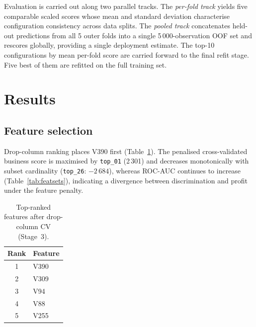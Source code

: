 \documentclass[cameraready]{Interspeech}
\begin{document}
Evaluation is carried out along two parallel tracks.
The \emph{per-fold track} yields five comparable scaled scores whose mean and standard
deviation characterise configuration consistency across data splits.
The \emph{pooled track} concatenates held-out predictions from all 5 outer folds into a
single 5\,000-observation OOF set and rescores globally, providing a single deployment
estimate.
The top-10 configurations by mean per-fold score are carried forward to the final refit
stage. Five best of them are refitted on the full training set.

\section{Results}
\label{sec:results}

\subsection{Feature selection}
\label{res:featsel}

Drop-column ranking places V390 first (Table~\ref{tab:topfeat}).
The penalised cross-validated business score is maximised by \texttt{top\_01} (2\,301) and decreases monotonically with subset cardinality (\texttt{top\_26}: $-2\,684$), whereas ROC-AUC continues to increase (Table~\ref{tab:featsets}), indicating a divergence between discrimination and profit under the feature penalty.

\begin{table}[t]
    \centering
    \caption{Top-ranked features after drop-column CV (Stage~3).}
    \label{tab:topfeat}
    \small
    \begin{tabular}{cl}
        \toprule
        Rank & Feature \\
        \midrule
        1 & V390 \\
        2 & V309 \\
        3 & V94 \\
        4 & V88 \\
        5 & V255 \\
        \bottomrule
    \end{tabular}
\end{table}
\end{document}
